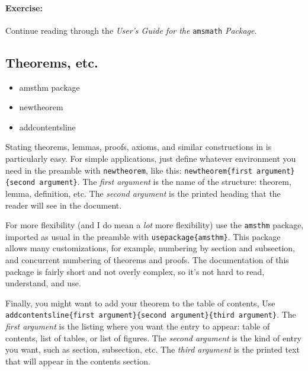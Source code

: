 		\paragraph{Exercise:}Continue reading through the \textit{User's Guide for the }\texttt{amsmath} \textit{Package}.

        \subsection{Theorems, etc.}
        \label{Theorems}
        
        \begin{cmd}
            \begin{itemize}
                \item{amsthm package}
                \item{newtheorem}
                \item{addcontentsline}
            \end{itemize}
        \end{cmd}

        Stating theorems, lemmas, proofs, axioms, and similar constructions in \Lx{} is particularly easy. For simple applications, just define whatever environment you need in the preamble with \texttt{newtheorem}, like this: \texttt{newtheorem\{first argument\}\{second argument\}}. The \textit{first argument} is the name of the structure: theorem, lemma, definition, etc. The \textit{second argument} is the printed heading that the reader will see in the document.

        For more flexibility (and I do mean a \textit{lot} more flexibility) use the \texttt{amsthm} package, imported as usual in the preamble with \texttt{usepackage\{amsthm\}}. This package allows many customizations, for example, numbering by section and subsection, and concurrent numbering of theorems and proofs. The documentation of this package is fairly short and not overly complex, so it's not hard to read, understand, and use.

        Finally, you might want to add your theorem to the table of contents, Use \texttt{addcontentsline\{first argument\}\{second argument\}\{third argument\}}. The \textit{first argument} is the listing where you want the entry to appear: table of contents, list of tables, or list of figures. The \textit{second argument} is the kind of entry you want, such as section, subsection, etc. The \textit{third argument} is the printed text that will appear in the contents section.

